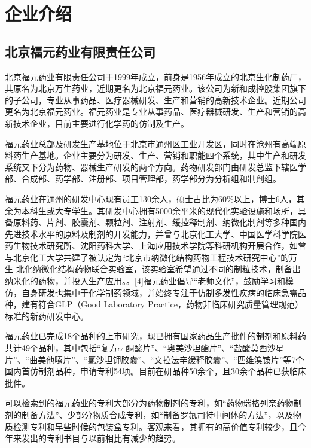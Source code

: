 \documentclass[twocolumn,openany]{ctexbook}
\begin{document}
\chapter{企业介绍}

		\section{北京福元药业有限责任公司}
		
		北京福元药业有限责任公司于1999年成立，前身是1956年成立的北京生化制药厂，其原名为北京万生药业，近期更名为北京福元药业。该公司为新和成控股集团旗下的子公司，专业从事药品、医疗器械研发、生产和营销的高新技术企业。近期公司更名为北京福元药业。福元药业是专业从事药品、医疗器械研发、生产和营销的高新技术企业，目前主要进行化学药的仿制及生产。
		
		福元药业总部及研发生产基地位于北京市通州区工业开发区，同时在沧州有高端原料药生产基地\citep{RN31}。企业主要分为研发、生产、营销和职能四个系统，其中生产和研发系统又下分为药物、器械生产研发的两个方向。药物研发部门由研发总监下辖医学部、合成部、药学部、注册部、项目管理部，药学部分为分析组和制剂组\citep{RN33}。
		
		福元药业在通州的研发中心现有员工130余人，硕士占比为60\%以上，博士6人，其余为本科生或大专学生。其研发中心拥有5000余平米的现代化实验设施和场所，具备原料药、片剂、胶囊剂、颗粒剂、注射剂、缓控释制剂、纳微化制剂等多种国内先进技术水平的原料及制剂的开发能力，并曾与北京化工大学、中国医学科学院医药生物技术研究所、沈阳药科大学、上海应用技术学院等科研机构开展合作，如曾与北京化工大学共建了被认定为“北京市纳微化结构药物工程技术研究中心”的万生-北化纳微化结构药物联合实验室，该实验室希望通过不同的制粒技术，制备出纳米化的药物，并投入生产应用。。[4]福元药业倡导“老师文化”，鼓励学习和模仿，自身研发也集中于化学制药领域，并始终专注于仿制多发性疾病的临床急需品种，建有符合GLP（Good Laboratory Practice，药物非临床研究质量管理规范）标准的新药研发中心\citep{RN30}。
		
		福元药业已完成18个品种的上市研究，现已拥有国家药品生产批件的制剂和原料药共计49个品种，其中包括“复方$\alpha$-酮酸片”、“奥美沙坦酯片”、“盐酸莫西沙星片”、“曲美他嗪片”、“氯沙坦钾胶囊”、“文拉法辛缓释胶囊”、“匹维溴铵片”等7个国内首仿制剂品种，申请专利54项。目前在研品种50余个，且30余个品种已获临床批件\citep{RN32}。
		
		可以检索到的福元药业的专利大部分为药物制剂的专利，如“药物瑞格列奈药物制剂的制备方法”、少部分物质合成专利，如“制备罗氟司特中间体的方法”，以及物质检测专利和早些时候的包装盒专利。客观来看，其拥有的高价值专利较少，且今年来发出的专利书目与以前相比有减少的趋势。
		
\end{document}
